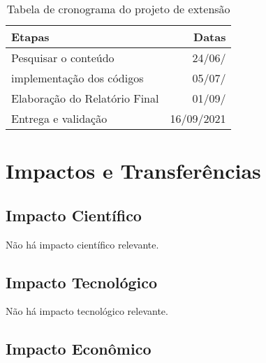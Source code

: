 \documentclass[a4paper,10pt]{article} %
\begin{document}
\begin{table}
\begin{center}
 \caption{Tabela de cronograma do projeto de extensão}
\begin{tabular}{|l|r|}
  \hline \hline
  \textbf{Etapas} & \textbf{Datas} \\ \hline \hline
   Pesquisar o conteúdo & 24/06/ \\ \hline
   implementação dos códigos & 05/07/ \\ \hline
   Elaboração do Relatório Final  & 01/09/ \\ \hline
   Entrega e validação & 16/09/2021 \\ \hline \hline
\end{tabular} 
\label{tab:resultados}
\end{center}
\end{table}


\section{Impactos e Transferências}

\subsection{Impacto Científico}

Não há impacto científico relevante.

\subsection{Impacto Tecnológico}

Não há impacto tecnológico relevante.

\subsection{Impacto Econômico}
\end{document}
